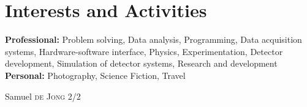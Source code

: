 \documentclass{article}
\begin{document}




\section{Interests and Activities}
\textbf{Professional:}
Problem solving, Data analysis, Programming, Data acquisition systems, Hardware-software interface, Physics, Experimentation, Detector development, Simulation of detector systems, Research and development\\
\textbf{Personal:}
Photography, Science Fiction, Travel

\vspace{\fill}
\centering Samuel \textsc{de Jong} 2/2
\end{document}
